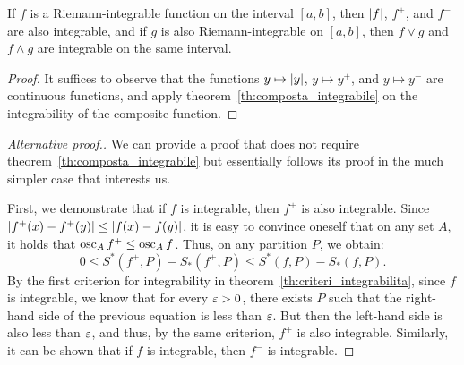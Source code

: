 \begin{theorem}%
\label{th:reticolo}%
If $f$ is a Riemann-integrable function on the interval $[a,b]$, then
${\left|f\right|}$, $f^+$, and $f^-$ are also integrable, and if
$g$ is also Riemann-integrable on $[a,b]$, then $f\vee g$ and $f\wedge g$
are integrable on the same interval.
\end{theorem}
%
\begin{proof}
  It suffices to observe that the functions 
  $y\mapsto {\left|y\right|}$, $y\mapsto y^+$, and $y\mapsto y^-$ 
  are continuous functions, and apply theorem~\ref{th:composta_integrabile}
  on the integrability of the composite function.
  \end{proof}
  \begin{proof}[Alternative proof.]
  We can provide a proof that does not require 
  theorem~\ref{th:composta_integrabile}
  but essentially follows its proof in the 
  much simpler case that interests us.

    First, we demonstrate that if $f$ is integrable, then $f^+$ is also
  integrable.
  Since ${\left|f^+(x)-f^+(y)\right|}\le {\left|f(x)-f(y)\right|}$, 
  it is easy to convince oneself that on any set $A$, it holds that 
  $\operatorname{osc}_A f^+ \le \operatorname{osc}_A f$.
  Thus, on any partition $P$,
  we obtain:
  \[
    0 \le S^*(f^+,P) - S_*(f^+,P) \le S^*(f,P) - S_*(f,P).
  \]
  By the first criterion for integrability in 
  theorem~\ref{th:criteri_integrabilita}, since $f$ is integrable, 
  we know that for every $\varepsilon>0$, there exists $P$ such that the right-hand 
  side of the previous equation is less than $\varepsilon$.
  But then the left-hand side is also less than $\varepsilon$, and thus, 
  by the same criterion, $f^+$ is also integrable.    
  Similarly, it can be shown that if $f$ is integrable, 
  then $f^-$ is integrable.
  

\end{proof}
